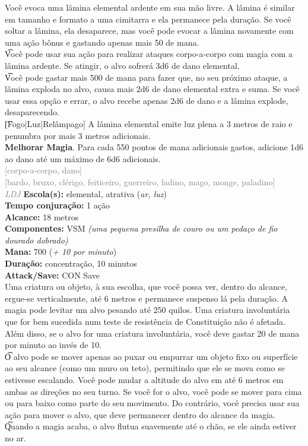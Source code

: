 \documentclass{RPG_Adventure}[2021/10/20]
\begin{document}
{\normalsize Você evoca uma lâmina elemental ardente em sua mão livre. A lâmina é similar em tamanho e formato a uma cimitarra e ela permanece pela duração. Se você soltar a lâmina, ela desaparece, mas você pode evocar a lâmina novamente com uma ação bônus e gastando apenas mais 50 de mana.\\\t Você pode usar sua ação para realizar ataques corpo-a-corpo com magia com a lâmina ardente. Se atingir, o alvo sofrerá 3d6 de dano elemental.\\\t Você pode gastar mais 500 de mana para fazer que, no seu próximo ataque, a lâmina exploda no alvo, causa mais 2d6 de dano elemental extra e suma. Se você usar essa opção e errar, o alvo recebe apenas 2d6 de dano e a lâmina explode, desaparecendo.\\\t [Fogo|Luz|Relâmpago] A lâmina elemental emite luz plena a 3 metros de raio e penumbra por mais 3 metros adicionais.\\\t \textbf{Melhorar Magia}. Para cada 550 pontos de mana adicionais gastos, adicione 1d6 ao dano até um máximo de 6d6 adicionais.\\}
{\scriptsize \textcolor{gray}{[corpo-a-corpo, dano]\\}}
{\scriptsize \textcolor{gray}{[bardo, bruxo, clérigo, feiticeiro, guerreiro, ladino, mago, monge, paladino]\\}}
{\tiny \textcolor{gray}{\textit{LDJ}}}
{\small \t \textbf{Escola(s):} elemental, atrativa (\textit{ar, luz})\\\t \textbf{Tempo conjuração:} 1 ação\\\t \textbf{Alcance:} 18 metros\\\t \textbf{Componentes:} VSM \textit{(uma pequena presilha de couro ou um pedaço de fio dourado dobrado)}\\\t \textbf{Mana:} 700 (\textit{+ 10 por minuto})\\\t \textbf{Duração:} concentração, 10 minutos\\\t \textbf{Attack/Save:} CON Save\\}
{\normalsize Uma criatura ou objeto, à sua escolha, que você possa ver, dentro do alcance, ergue-se verticalmente, até 6 metros e permanece suspenso lá pela duração. A magia pode levitar um alvo pesando até 250 quilos. Uma criatura involuntária que for bem sucedida num teste de resistência de Constituição não é afetada. Além disso, se o alvo for uma criatura involuntária, você deve gastar 20 de mana por minuto ao invés de 10.\\\t O alvo pode se mover apenas ao puxar ou empurrar um objeto fixo ou superfície ao seu alcance (como um muro ou teto), permitindo que ele se mova como se estivesse escalando. Você pode mudar a altitude do alvo em até 6 metros em ambas as direções no seu turno. Se você for o alvo, você pode se mover para cima ou para baixo como parte do seu movimento. Do contrário, você precisa usar sua ação para mover o alvo, que deve permanecer dentro do alcance da magia.  \\\t Quando a magia acaba, o alvo flutua suavemente até o chão, se ele ainda estiver no ar.\\}
\end{document}

